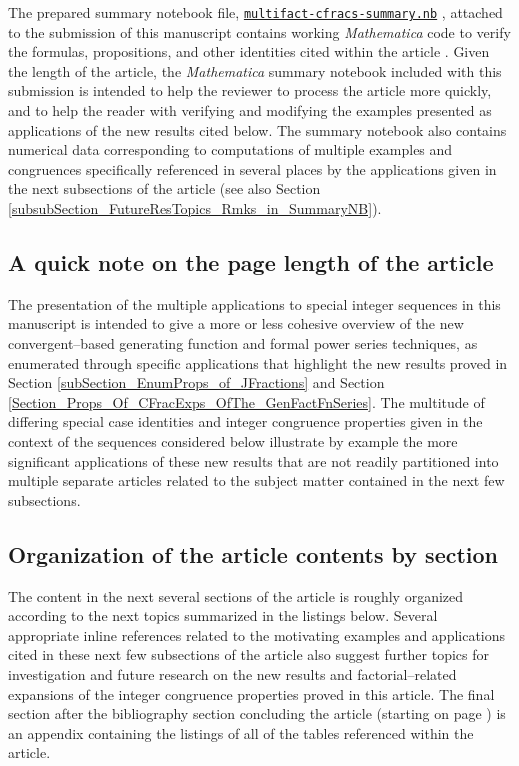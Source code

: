 \documentclass[12pt,reqno]{article}
\numberwithin{sfootnote}{section}
\numberwithin{equation}{section}
\theoremstyle{DefaultTheoremStyle}
\theoremstyle{definition}
\newcommand{\TheSummaryNBFile}[0]{\texttt{multifact-cfracs-summary.nb}}
\newcommand{\TheSummaryNBFileGoogleDriveLink}[0]{https://drive.google.com/file/d/0B6na6iIT7ICZRFltbTVVcmVpVk0/view?usp=drivesdk}
\renewcommand{\TheSummaryNBFile}{ 
     \href{\TheSummaryNBFileGoogleDriveLink}{\texttt{multifact-cfracs-summary.nb}}%
}
\newcommand{\Mm}[0]{\emph{Mathematica}}
\begin{document}
The prepared summary notebook file, \TheSummaryNBFile, 
attached to the submission of this manuscript 
contains working \Mm{} code to verify the formulas, 
propositions, and other identities cited within the article 
\citep{SUMMARYNBREF-STUB}. 
Given the length of the article, 
the \Mm{} summary notebook included with this submission 
is intended to help the reviewer to process the 
article more quickly, and to help the reader with verifying and 
modifying the examples presented as 
applications of the new results cited below. 
The summary notebook also contains numerical data 
corresponding to computations of multiple examples and 
congruences specifically referenced in several places by the 
applications given in the next subsections of the article 
(see also Section \ref{subsubSection_FutureResTopics_Rmks_in_SummaryNB}). 

\subsection{A quick note on the page length of the article} 

The presentation of the multiple applications to 
special integer sequences in this manuscript is intended to give a 
more or less cohesive overview of the 
new convergent--based generating function and formal power series 
techniques, as enumerated through specific applications that 
highlight the new results proved in 
Section \ref{subSection_EnumProps_of_JFractions} and 
Section \ref{Section_Props_Of_CFracExps_OfThe_GenFactFnSeries}. 
The multitude of differing special case identities and 
integer congruence properties given in the context of the sequences 
considered below illustrate by example the 
more significant applications of these new results that 
are not readily partitioned into multiple separate articles 
related to the subject matter contained in the next few subsections. 

\subsection{Organization of the article contents by section} 

The content in the next several sections of the article is 
roughly organized according to the 
next topics summarized in the listings below. 
Several appropriate inline references related to the motivating examples and 
applications cited in these next few subsections of the article 
also suggest further topics for investigation and future research 
on the new results and factorial--related expansions of the 
integer congruence properties proved in this article. 
The final section after the bibliography section concluding the article 
(starting on page \pageref{page_StartOfTableData}) 
is an appendix containing the listings of all of the 
tables referenced within the article. 
\end{document}
